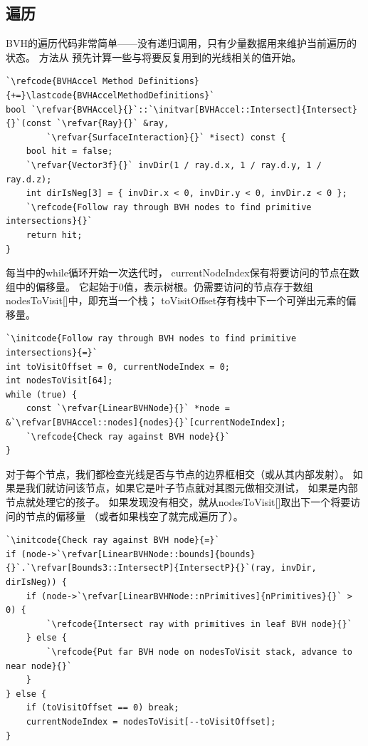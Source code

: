 \subsection{遍历}\label{sub:遍历}
BVH的遍历代码非常简单——没有递归调用，只有少量数据用来维护当前遍历的状态。
方法从
预先计算一些与将要反复用到的光线相关的值开始。
\begin{lstlisting}
`\refcode{BVHAccel Method Definitions}{+=}\lastcode{BVHAccelMethodDefinitions}`
bool `\refvar{BVHAccel}{}`::`\initvar[BVHAccel::Intersect]{Intersect}{}`(const `\refvar{Ray}{}` &ray,
        `\refvar{SurfaceInteraction}{}` *isect) const {
    bool hit = false;
    `\refvar{Vector3f}{}` invDir(1 / ray.d.x, 1 / ray.d.y, 1 / ray.d.z);
    int dirIsNeg[3] = { invDir.x < 0, invDir.y < 0, invDir.z < 0 };
    `\refcode{Follow ray through BVH nodes to find primitive intersections}{}`
    return hit;
}
\end{lstlisting}

每当中的{\ttfamily while}循环开始一次迭代时，
{\ttfamily currentNodeIndex}保有将要访问的节点在数组中的偏移量。
它起始于0值，表示树根。仍需要访问的节点存于数组{\ttfamily nodesToVisit[]}中，即充当一个栈；
{\ttfamily toVisitOffset}存有栈中下一个可弹出元素的偏移量。
\begin{lstlisting}
`\initcode{Follow ray through BVH nodes to find primitive intersections}{=}`
int toVisitOffset = 0, currentNodeIndex = 0;
int nodesToVisit[64];
while (true) {
    const `\refvar{LinearBVHNode}{}` *node = &`\refvar[BVHAccel::nodes]{nodes}{}`[currentNodeIndex];
    `\refcode{Check ray against BVH node}{}`
}
\end{lstlisting}

对于每个节点，我们都检查光线是否与节点的边界框相交（或从其内部发射）。
如果是我们就访问该节点，如果它是叶子节点就对其图元做相交测试，
如果是内部节点就处理它的孩子。
如果发现没有相交，就从{\ttfamily nodesToVisit[]}取出下一个将要访问的节点的偏移量
（或者如果栈空了就完成遍历了）。
\begin{lstlisting}
`\initcode{Check ray against BVH node}{=}`
if (node->`\refvar[LinearBVHNode::bounds]{bounds}{}`.`\refvar[Bounds3::IntersectP]{IntersectP}{}`(ray, invDir, dirIsNeg)) {
    if (node->`\refvar[LinearBVHNode::nPrimitives]{nPrimitives}{}` > 0) {
        `\refcode{Intersect ray with primitives in leaf BVH node}{}`
    } else {
        `\refcode{Put far BVH node on nodesToVisit stack, advance to near node}{}`
    }
} else {
    if (toVisitOffset == 0) break;
    currentNodeIndex = nodesToVisit[--toVisitOffset];
}
\end{lstlisting}

